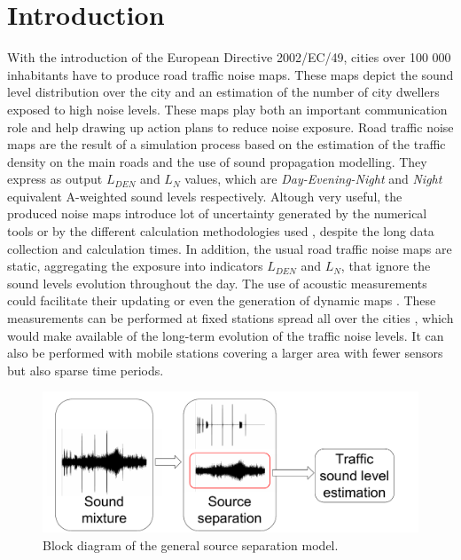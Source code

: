 \documentclass[twocolumn]{svjour3}          %
\begin{document}
\section{Introduction} \label{part:intro}

With the introduction of the European Directive 2002/EC/49, cities over 100 000 inhabitants have to produce road traffic noise maps. These maps depict the sound level distribution over the city and an estimation of the number of city dwellers exposed to high noise levels. These maps play both an important communication role and help drawing up action plans to reduce noise exposure. Road traffic noise maps are the result of a simulation process based on the estimation of the traffic density on the main roads and the use of sound propagation modelling. They express as output $L_ {DEN}$ and $L_N$ values, which are \textit{Day-Evening-Night} and \textit{Night} equivalent A-weighted sound levels respectively. Altough very useful, the produced noise maps introduce lot of uncertainty generated by the numerical tools \cite{van_leeuwen_noise_2015} or by the different calculation methodologies used \cite{leroy_uncertainty_2010}\cite{garg_critical_2014}, despite the long data collection and calculation times. In addition, the usual road traffic noise maps are static, aggregating the exposure into indicators $L_{DEN}$ and $L_N$, that ignore the sound levels evolution throughout the day.
The use of acoustic measurements could facilitate their updating or even the generation of dynamic maps \cite{wei_dynamic_2016}. These measurements can be performed at fixed stations spread all over the cities \cite{Mioduszewski} \cite{mietlicki2012innovative}, which would make available of the long-term evolution of the traffic noise levels. It can also be performed with  mobile stations \cite{can_exploring_2012} \cite{manvell2004sadmam} covering a larger area with fewer sensors but also sparse time periods.

\begin{figure}[t]
\centering
\includegraphics[width=\linewidth]{figures/bloc_diagram_source_separation.pdf}
\caption{Block diagram of the general source separation model.}
\label{fig:diagram}
\end{figure}
\end{document}
